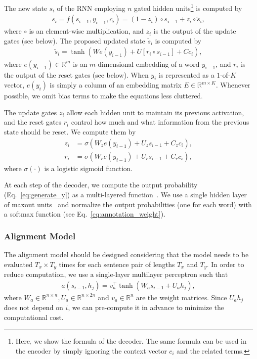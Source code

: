 \documentclass{article} %
\newcommand{\RR}[0]{\mathbb{R}}
\begin{document}
The new state $s_i$ of the RNN employing $n$ gated hidden units\footnote{
    Here, we show the formula of the decoder. The same formula can be used in
    the encoder by simply ignoring the context vector $c_i$ and the related
    terms.
}
is computed by
\begin{align*}
    s_i = f(s_{i-1}, y_{i-1}, c_i) = (1 - z_i) \circ s_{i-1} + z_i \circ \tilde{s}_{i},
\end{align*}
where $\circ$ is an element-wise multiplication, and $z_i$ is the output of the
update gates (see below). The proposed updated state $\tilde{s}_{i}$ is computed
by
\begin{align*}
    \tilde{s}_{i} = \tanh \left( W e(y_{i - 1}) + U \left[ r_i \circ s_{i - 1} \right] +
    C c_i \right),
\end{align*}
where $e(y_{i-1}) \in \RR^{m}$ is an $m$-dimensional embedding of a word
$y_{i-1}$, and $r_i$ is the output of the reset gates (see below).  When $y_i$
is represented as a $1$-of-$K$ vector, $e(y_i)$ is simply a column of an
embedding matrix $E \in \RR^{m \times K}$. Whenever possible, we omit bias terms
to make the equations less cluttered.

The update gates $z_i$ allow each hidden unit to maintain its previous
activation, and the reset gates $r_i$ control how much and what information from
the previous state should be reset. We compute them by
\begin{align*}
    z_i &= \sigma \left( W_{z} e(y_{i - 1}) + U_{z} s_{i - 1} + C_{z} c_i\right), \\
    r_i &= \sigma \left( W_{r} e(y_{i - 1}) + U_{r} s_{i - 1} + C_{r} c_i\right),
\end{align*}
where $\sigma\left(\cdot\right)$ is a logistic sigmoid function.

At each step of the decoder, we compute the output probability
(Eq.~\eqref{eq:generate_y}) as a multi-layered function~\citep{Pascanu2014rec}.
We use a single hidden layer of maxout units~\citep{Goodfellow2013} and
normalize the output probabilities (one for each word) with a softmax function
(see Eq.~\eqref{eq:annotation_weight}).

\subsubsection{Alignment Model}

The alignment model should be designed considering that the model needs to be
evaluated $T_x \times T_y$ times for each sentence pair of lengths $T_x$ and
$T_y$. In order to reduce computation, we use a single-layer multilayer
perceptron such that 
\begin{align*}
    a(s_{i-1}, h_j) = v_a^{\top} \tanh\left( W_a s_{i-1} + U_a h_j \right),
\end{align*}
where $W_a \in \RR^{n\times n}, U_a \in \RR^{n\times 2n}$ and $v_a \in \RR^{n}$
are the weight matrices. Since $U_a h_j$ does not depend on $i$, we can
pre-compute it in advance to minimize the computational cost. 
\end{document}
